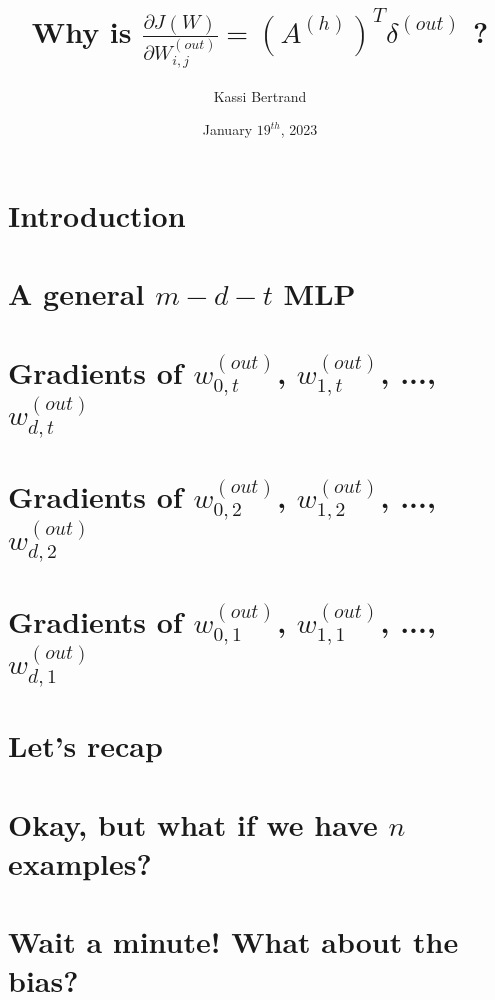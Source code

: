 \documentclass[12pt, letterpaper]{article}
\title{Why is $ \frac{\partial J(W)}{\partial W_{i,j}^{(out)}} = (A^{(h)})^{T} \delta^{(out)}$ ?}
\author{Kassi Bertrand}
\date{January $19^{th}$, 2023}
\begin{document}
\maketitle

\section{Introduction}


\pagebreak
\section{A general $m-d-t$ MLP}


\section{Gradients of $w_{0,t}^{(out)}$, $w_{1,t}^{(out)}$, ..., $w_{d,t}^{(out)}$}


\pagebreak
\section{Gradients of $w_{0,2}^{(out)}$, $w_{1,2}^{(out)}$, ..., $w_{d,2}^{(out)}$}


\pagebreak
\section{Gradients of $w_{0,1}^{(out)}$, $w_{1,1}^{(out)}$, ..., $w_{d,1}^{(out)}$}


\pagebreak
\section{Let's recap}


\pagebreak
\section{Okay, but what if we have $n$ examples?}


\section{Wait a minute! What about the bias?}
\end{document}
